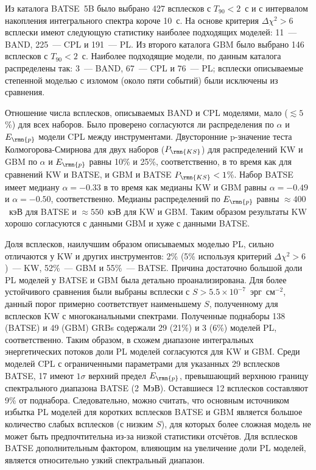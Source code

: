 Из каталога BATSE~5B было выбрано 427 всплесков с $T_{90}<2$~с и с интервалом 
накопления интегрального спектра короче 10~с. На основе критерия $\Delta \chi^2>6$
всплески имеют следующую статистику наиболее подходящих моделей:
11~--- BAND, 225~--- CPL и 191~--- PL.
Из второго каталога GBM было выбрано 146 всплесков с $T_{90}<2$~с. Наиболее подходящие модели,
по данным каталога распределены так: 3~--- BAND, 67~--- CPL и 76~--- PL;
всплески описываемые степенной моделью с изломом (около пяти событий) были 
исключены из сравнения.

Отношение числа всплесков, описываемых BAND и CPL моделями, мало ($\lesssim 5$\%)
для всех наборов. Было проверено согласуются ли распределения по $\alpha$ и 
$E_\rmn{p}$ модели CPL между инструментами. Двусторонние p-значение 
теста Колмогорова-Смирнова для двух наборов ($P_\rmn{KS}$) для распределений 
KW и GBM по $\alpha$ и $E_\rmn{p}$ равны 10\% и 25\%, соответственно, в то время 
как для сравнений KW и BATSE, и GBM и BATSE $P_\rmn{KS}<1$\%.
Набор BATSE имеет медиану $\alpha=-0.33$ в то время как медианы KW и GBM равны
$\alpha=-0.49$ и $\alpha=-0.50$, соответственно.
Медианы распределений по $E_\rmn{p}$ равны $\approx 400$~кэВ для BATSE и 
$\approx 550$~кэВ для KW и GBM.
Таким образом результаты KW хорошо согласуются с данными GBM и хуже с данными BATSE.

Доля всплесков, наилучшим образом описываемых моделью PL, сильно отличаются у KW и
других инструментов:
2\% (5\% используя критерий $\Delta \chi^2 > 6$)~--- KW, 52\%~--- GBM и 55\%~--- BATSE.
Причина достаточно большой доли PL моделей у BATSE и GBM была детально проанализирована.
Для более устойчивого сравнения были выбраны всплески с $S>5.5\times 10^{-7}$~эрг~см$^{-2}$,
данный порог примерно соответствует наименьшему $S$, полученному для всплесков KW с многоканальными
спектрами. Полученные поднаборы 138 (BATSE) и 49 (GBM) GRBs содержали 29 (21\%) и 3 (6\%) моделей PL, соответственно. 
Таким образом, в схожем диапазоне интегральных энергетических потоков доли PL моделей
согласуются для KW и GBM.
Среди моделей CPL с ограниченными параметрами для указанных 29 всплесков BATSE,
17 имеют $1\sigma$ верхний предел $E_\rmn{p}$, превышающий верхнюю границу 
спектрального диапазона  BATSE (2~МэВ). Оставшиеся 12 всплесков составляют 9\% от поднабора. 
Следовательно, можно считать, что основным источником избытка PL моделей для коротких 
всплесков BATSE и GBM является большое количество слабых всплесков (с низким $S$),
для которых более сложная модель не может быть предпочтительна из-за низкой статистики отсчётов.
Для всплесков BATSE дополнительным фактором, влияющим на увеличение доли PL моделей, 
является относительно узкий спектральный диапазон.

